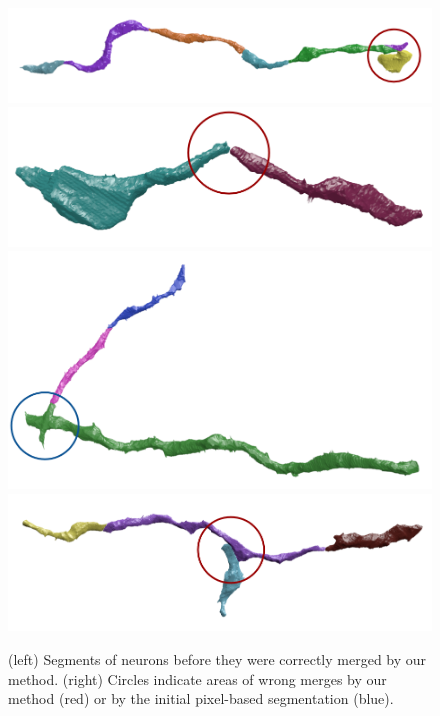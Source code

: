 \begin{figure}[t]
	\begin{minipage}{0.45\linewidth}
		\centering
		\includegraphics[width=0.85\linewidth]{./figures/VI-results/multicut-incorrect1.png}
		\includegraphics[width=0.85\linewidth]{./figures/VI-results/multicut-incorrect2.png}
		\includegraphics[width=0.85\linewidth]{./figures/VI-results/multicut-incorrect3.png}
		\includegraphics[width=0.85\linewidth]{./figures/VI-results/multicut-incorrect4.png}
	\end{minipage}
	\caption{(left) Segments of neurons before they were correctly merged by our method. (right) Circles indicate areas of wrong merges by our method (red) or by the initial pixel-based segmentation (blue).}
	\label{fig:qualitative-results}
\end{figure}

